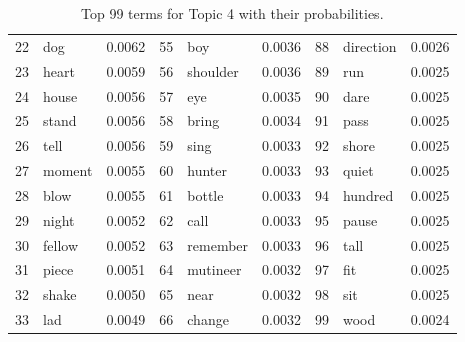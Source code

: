 \begin{table}[ht]
\begin{tabular}{rlrrlrrlr}
  22 & dog & 0.0062 & 55 & boy & 0.0036 & 88 & direction & 0.0026 \\ 
  23 & heart & 0.0059 & 56 & shoulder & 0.0036 & 89 & run & 0.0025 \\ 
  24 & house & 0.0056 & 57 & eye & 0.0035 & 90 & dare & 0.0025 \\ 
  25 & stand & 0.0056 & 58 & bring & 0.0034 & 91 & pass & 0.0025 \\ 
  26 & tell & 0.0056 & 59 & sing & 0.0033 & 92 & shore & 0.0025 \\ 
  27 & moment & 0.0055 & 60 & hunter & 0.0033 & 93 & quiet & 0.0025 \\ 
  28 & blow & 0.0055 & 61 & bottle & 0.0033 & 94 & hundred & 0.0025 \\ 
  29 & night & 0.0052 & 62 & call & 0.0033 & 95 & pause & 0.0025 \\ 
  30 & fellow & 0.0052 & 63 & remember & 0.0033 & 96 & tall & 0.0025 \\ 
  31 & piece & 0.0051 & 64 & mutineer & 0.0032 & 97 & fit & 0.0025 \\ 
  32 & shake & 0.0050 & 65 & near & 0.0032 & 98 & sit & 0.0025 \\ 
  33 & lad & 0.0049 & 66 & change & 0.0032 & 99 & wood & 0.0024 \\ 
   \hline
\end{tabular}
\caption{\small{ Top 99 terms for Topic 4 with their probabilities.}} 
\label{topic_4_terms}
\end{table}
